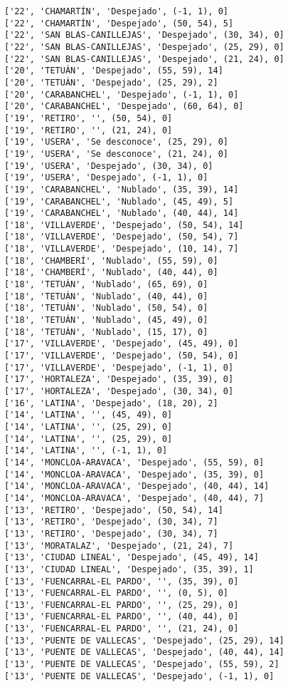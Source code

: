 \documentclass[11pt]{article}
\begin{document}
\begin{Verbatim}[commandchars=\\\{\}]
['22', 'CHAMARTÍN', 'Despejado', (-1, 1), 0]
['22', 'CHAMARTÍN', 'Despejado', (50, 54), 5]
['22', 'SAN BLAS-CANILLEJAS', 'Despejado', (30, 34), 0]
['22', 'SAN BLAS-CANILLEJAS', 'Despejado', (25, 29), 0]
['22', 'SAN BLAS-CANILLEJAS', 'Despejado', (21, 24), 0]
['20', 'TETUÁN', 'Despejado', (55, 59), 14]
['20', 'TETUÁN', 'Despejado', (25, 29), 2]
['20', 'CARABANCHEL', 'Despejado', (-1, 1), 0]
['20', 'CARABANCHEL', 'Despejado', (60, 64), 0]
['19', 'RETIRO', '', (50, 54), 0]
['19', 'RETIRO', '', (21, 24), 0]
['19', 'USERA', 'Se desconoce', (25, 29), 0]
['19', 'USERA', 'Se desconoce', (21, 24), 0]
['19', 'USERA', 'Despejado', (30, 34), 0]
['19', 'USERA', 'Despejado', (-1, 1), 0]
['19', 'CARABANCHEL', 'Nublado', (35, 39), 14]
['19', 'CARABANCHEL', 'Nublado', (45, 49), 5]
['19', 'CARABANCHEL', 'Nublado', (40, 44), 14]
['18', 'VILLAVERDE', 'Despejado', (50, 54), 14]
['18', 'VILLAVERDE', 'Despejado', (50, 54), 7]
['18', 'VILLAVERDE', 'Despejado', (10, 14), 7]
['18', 'CHAMBERÍ', 'Nublado', (55, 59), 0]
['18', 'CHAMBERÍ', 'Nublado', (40, 44), 0]
['18', 'TETUÁN', 'Nublado', (65, 69), 0]
['18', 'TETUÁN', 'Nublado', (40, 44), 0]
['18', 'TETUÁN', 'Nublado', (50, 54), 0]
['18', 'TETUÁN', 'Nublado', (45, 49), 0]
['18', 'TETUÁN', 'Nublado', (15, 17), 0]
['17', 'VILLAVERDE', 'Despejado', (45, 49), 0]
['17', 'VILLAVERDE', 'Despejado', (50, 54), 0]
['17', 'VILLAVERDE', 'Despejado', (-1, 1), 0]
['17', 'HORTALEZA', 'Despejado', (35, 39), 0]
['17', 'HORTALEZA', 'Despejado', (30, 34), 0]
['16', 'LATINA', 'Despejado', (18, 20), 2]
['14', 'LATINA', '', (45, 49), 0]
['14', 'LATINA', '', (25, 29), 0]
['14', 'LATINA', '', (25, 29), 0]
['14', 'LATINA', '', (-1, 1), 0]
['14', 'MONCLOA-ARAVACA', 'Despejado', (55, 59), 0]
['14', 'MONCLOA-ARAVACA', 'Despejado', (35, 39), 0]
['14', 'MONCLOA-ARAVACA', 'Despejado', (40, 44), 14]
['14', 'MONCLOA-ARAVACA', 'Despejado', (40, 44), 7]
['13', 'RETIRO', 'Despejado', (50, 54), 14]
['13', 'RETIRO', 'Despejado', (30, 34), 7]
['13', 'RETIRO', 'Despejado', (30, 34), 7]
['13', 'MORATALAZ', 'Despejado', (21, 24), 7]
['13', 'CIUDAD LINEAL', 'Despejado', (45, 49), 14]
['13', 'CIUDAD LINEAL', 'Despejado', (35, 39), 1]
['13', 'FUENCARRAL-EL PARDO', '', (35, 39), 0]
['13', 'FUENCARRAL-EL PARDO', '', (0, 5), 0]
['13', 'FUENCARRAL-EL PARDO', '', (25, 29), 0]
['13', 'FUENCARRAL-EL PARDO', '', (40, 44), 0]
['13', 'FUENCARRAL-EL PARDO', '', (21, 24), 0]
['13', 'PUENTE DE VALLECAS', 'Despejado', (25, 29), 14]
['13', 'PUENTE DE VALLECAS', 'Despejado', (40, 44), 14]
['13', 'PUENTE DE VALLECAS', 'Despejado', (55, 59), 2]
['13', 'PUENTE DE VALLECAS', 'Despejado', (-1, 1), 0]

\end{Verbatim}
\end{document}
